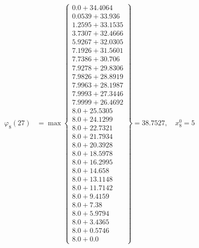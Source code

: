 \documentclass{article}
\begin{document}
\begin{align*}
\varphi_{8}(27) &= \max \left\{ \begin{array}{c}
0.0 + 34.4064 \\
 0.0539 + 33.936 \\
 1.2595 + 33.1535 \\
 3.7307 + 32.4666 \\
 5.9267 + 32.0305 \\
 7.1926 + 31.5601 \\
 7.7386 + 30.706 \\
 7.9278 + 29.8306 \\
 7.9826 + 28.8919 \\
 7.9963 + 28.1987 \\
 7.9993 + 27.3446 \\
 7.9999 + 26.4692 \\
 8.0 + 25.5305 \\
 8.0 + 24.1299 \\
 8.0 + 22.7321 \\
 8.0 + 21.7934 \\
 8.0 + 20.3928 \\
 8.0 + 18.5978 \\
 8.0 + 16.2995 \\
 8.0 + 14.658 \\
 8.0 + 13.1148 \\
 8.0 + 11.7142 \\
 8.0 + 9.4159 \\
 8.0 + 7.38 \\
 8.0 + 5.9794 \\
 8.0 + 3.4365 \\
 8.0 + 0.5746 \\
 8.0 + 0.0
\end{array} \right\}=38.7527, \quad x_{8}^0=5\\
  

\end{align*}
\end{document}
